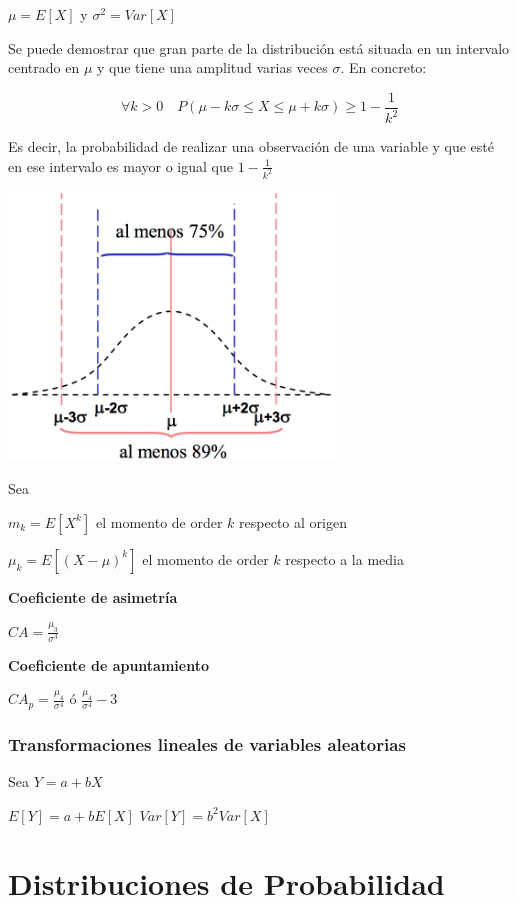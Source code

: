 \documentclass[]{article}
\numberwithin{equation}{section}
\begin{document}
\(\mu=E[X]\) y \(\sigma^2 = Var[X]\)

Se puede demostrar que gran parte de la distribución está situada en un
intervalo centrado en \(\mu\) y que tiene una amplitud varias veces
\(\sigma\). En concreto:

\[
\forall k>0 \quad P(\mu - k \sigma \leq X \leq \mu + k \sigma) \geq 1-\frac{1}{k^2}
\]

Es decir, la probabilidad de realizar una observación de una variable y
que esté en ese intervalo es mayor o igual que \(1-\frac{1}{k^2}\)

\includegraphics[width=0.65000\textwidth]{pics/chebyshev.png}

Sea

\(m_k = E[X^k]\) el momento de order \(k\) respecto al origen

\(\mu_k = E[(X-\mu)^k]\) el momento de order \(k\) respecto a la media

\textbf{Coeficiente de asimetría}

\(CA = \frac{\mu_3}{\sigma^3}\)

\textbf{Coeficiente de apuntamiento}

\(CA_p = \frac{\mu_4}{\sigma^4}\) ó \(\frac{\mu_4}{\sigma^4}-3\)

\subsubsection{Transformaciones lineales de variables
aleatorias}\label{transformaciones-lineales-de-variables-aleatorias}

Sea \(Y = a + bX\)

\(E[Y] = a + b E[X]\) \(Var[Y] = b^2 Var[X]\)

\section{Distribuciones de
Probabilidad}\label{distribuciones-de-probabilidad}
\end{document}
